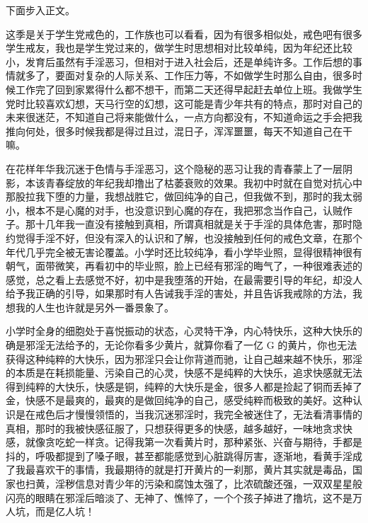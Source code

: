下面步入正文。

这季是关于学生党戒色的，工作族也可以看看，因为有很多相似处，戒色吧有很多学生戒友，我也是学生党过来的，做学生时思想相对比较单纯，因为年纪还比较小，发育后虽然有手淫恶习，但相对于进入社会后，还是单纯许多。工作后想的事情就多了，要面对复杂的人际关系、工作压力等，不如做学生时那么自由，很多时候工作完了回到家累得什么都不想干，而第二天还得早起赶去单位上班。我做学生党时比较喜欢幻想，天马行空的幻想，这可能是青少年共有的特点，那时对自己的未来很迷茫，不知道自己将来能做什么，一点方向都没有，不知道命运之手会把我推向何处，很多时候我都是得过且过，混日子，浑浑噩噩，每天不知道自己在干嘛。

在花样年华我沉迷于色情与手淫恶习，这个隐秘的恶习让我的青春蒙上了一层阴影，本该青春绽放的年纪我却撸出了枯萎衰败的效果。我初中时就在自觉对抗心中那股拉我下堕的力量，我想战胜它，做回纯净的自己，但我做不到，那时的我太弱小，根本不是心魔的对手，也没意识到心魔的存在，我把邪念当作自己，认贼作子。那十几年我一直没有接触到真相，所谓真相就是关于手淫的具体危害，那时隐约觉得手淫不好，但没有深入的认识和了解，也没接触到任何的戒色文章，在那个年代几乎完全被无害论覆盖。小学时还比较纯净，看小学毕业照，显得很精神很有朝气，面带微笑，再看初中的毕业照，脸上已经有邪淫的晦气了，一种很难表述的感觉，总之看上去感觉不好，初中是我堕落的开始，在最需要引导的年纪，却没人给予我正确的引导，如果那时有人告诫我手淫的害处，并且告诉我戒除的方法，我想我的人生也许就是另外一番景象了。

小学时全身的细胞处于喜悦振动的状态，心灵特干净，内心特快乐，这种大快乐的确是邪淫无法给予的，无论你看多少黄片，就算你看了一亿 G 的黄片，你也无法获得这种纯粹的大快乐，因为邪淫只会让你背道而驰，让自己越来越不快乐，邪淫的本质是在耗损能量、污染自己的心灵，快感不是纯粹的大快乐，追求快感就无法得到纯粹的大快乐，快感是铜，纯粹的大快乐是金，很多人都是捡起了铜而丢掉了金，快感不是最爽的，最爽的是做回纯净的自己，感受纯粹而极致的美好。这种认识是在戒色后才慢慢领悟的，当我沉迷邪淫时，我完全被迷住了，无法看清事情的真相，那时的我被快感征服了，只想获得更多的快感，越多越好，一味地贪求快感，就像贪吃蛇一样贪。记得我第一次看黄片时，那种紧张、兴奋与期待，手都是抖的，呼吸都提到了嗓子眼，甚至都能感觉到心脏跳得厉害，逐渐地，看黄手淫成了我最喜欢干的事情，我最期待的就是打开黄片的一刹那，黄片其实就是毒品，国家也扫黄，淫秽信息对青少年的污染和腐蚀太强了，比浓硫酸还强，一双双星星般闪亮的眼睛在邪淫后暗淡了、无神了、憔悴了，一个个孩子掉进了撸坑，这不是万人坑，而是亿人坑！


